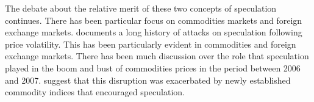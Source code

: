 \documentclass[ijfs,article,submit,oneauthor,pdftex,10pt,a4paper]{mdpi}
\begin{document}
{%

The debate about the relative merit of these two concepts of speculation continues. There has been particular focus on commodities markets and foreign exchange markets.  \citet{Jacksspec} documents a long history of attacks on speculation following price volatility. This has been particularly evident in commodities and foreign exchange markets.  There has been much discussion over the role that speculation played in the boom and bust of commodities prices in the period between 2006 and 2007.  \citet{TangSpec} suggest that this disruption was exacerbated by newly established commodity indices that encouraged speculation.

}
\end{document}
